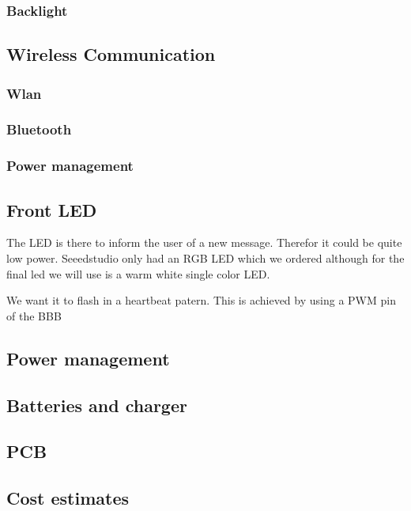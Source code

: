 \subsubsection{Backlight}
\subsection{Wireless Communication}
\subsubsection{Wlan}
\subsubsection{Bluetooth}
\subsubsection{Power management}
\subsection{Front LED}
The LED is there to inform the user of a new message. Therefor it could be quite low power. Seeedstudio only had an RGB LED which we ordered although for the final led we will use is a warm white single color LED.

We want it to flash in a heartbeat patern. This is achieved by using a PWM pin of the BBB
\subsection{Power management}
\subsection{Batteries and charger}
\subsection{PCB}
\subsection{Cost estimates}
